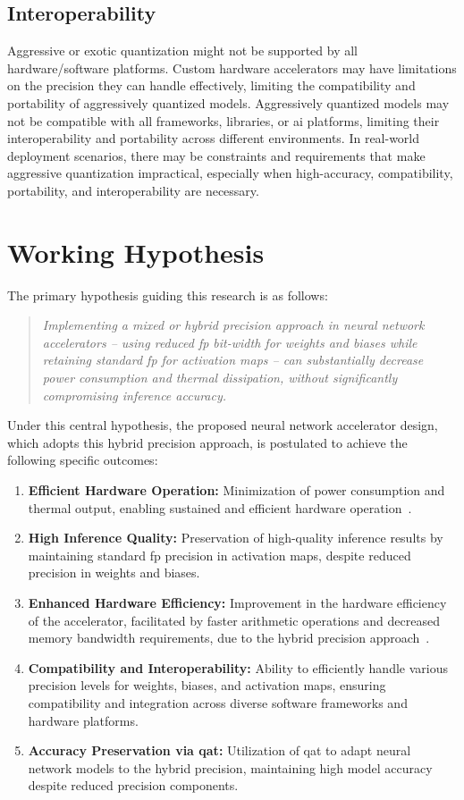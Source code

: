 \subsection{Interoperability}
Aggressive or exotic quantization might not be supported by all hardware/software platforms. Custom hardware accelerators may have limitations on the precision they can handle effectively, limiting the compatibility and portability of aggressively quantized models. Aggressively quantized models may not be compatible with all frameworks, libraries, or \gls{ai} platforms, limiting their interoperability and portability across different environments. In real-world deployment scenarios, there may be constraints and requirements that make aggressive quantization impractical, especially when high-accuracy, compatibility, portability, and interoperability are necessary.
\section{Working Hypothesis}

The primary hypothesis guiding this research is as follows:

\begin{quote}
	\textit{Implementing a mixed or hybrid precision approach in neural network accelerators -- using reduced \gls{fp} bit-width for weights and biases while retaining standard \gls{fp} for activation maps -- can substantially decrease power consumption and thermal dissipation, without significantly compromising inference accuracy.}
\end{quote}

Under this central hypothesis, the proposed neural network accelerator design, which adopts this hybrid precision approach, is postulated to achieve the following specific outcomes:

\begin{enumerate}[label={\textbf{H\arabic*}}]
	\item \textbf{Efficient Hardware Operation:} Minimization of power consumption and thermal output, enabling sustained and efficient hardware operation~\cite{lai2017deep}.
	\item \textbf{High Inference Quality:} Preservation of high-quality inference results by maintaining standard \gls{fp} precision in activation maps, despite reduced precision in weights and biases.
	\item \textbf{Enhanced Hardware Efficiency:} Improvement in the hardware efficiency of the accelerator, facilitated by faster arithmetic operations and decreased memory bandwidth requirements, due to the hybrid precision approach~\cite{lai2017deep}.
	\item \textbf{Compatibility and Interoperability:} Ability to efficiently handle various precision levels for weights, biases, and activation maps, ensuring compatibility and integration across diverse software frameworks and hardware platforms.
	\item \textbf{Accuracy Preservation via \gls{qat}:} Utilization of \gls{qat} to adapt neural network models to the hybrid precision, maintaining high model accuracy despite reduced precision components.
\end{enumerate}

